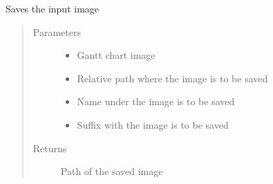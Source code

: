 \documentclass[letterpaper,10pt,english]{sphinxmanual}
\begin{document}
\begin{fulllineitems}
\begin{fulllineitems}
\label{\detokenize{visuals_generator:visuals_generator.gantt_chart.GanttChartPlotter.save_gantt_chart_image}}
\sphinxAtStartPar
Saves the input image
\begin{quote}\begin{description}
\item[{Parameters}] \leavevmode\begin{itemize}
\item {} 
\sphinxAtStartPar
{} \textendash{} Gantt chart image

\item {} 
\sphinxAtStartPar
{} \textendash{} Relative path where the image is to be saved

\item {} 
\sphinxAtStartPar
{} \textendash{} Name under the image is to be saved

\item {} 
\sphinxAtStartPar
{} \textendash{} Suffix with the image is to be saved

\end{itemize}

\item[{Returns}] \leavevmode
\sphinxAtStartPar
Path of the saved image

\end{description}\end{quote}


\end{fulllineitems}
\end{fulllineitems}
\end{document}
